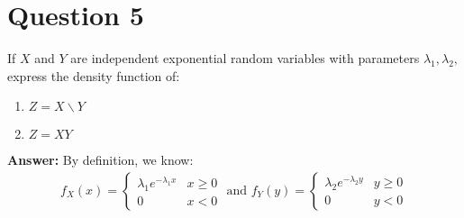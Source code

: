 \documentclass[hidelinks]{article}
\begin{document}
\section{Question 5}
If $X$ and $Y$ are independent exponential random variables with parameters $\lambda_1, \lambda_2,$ express the density function of:
\begin{enumerate}
    \item $Z = X\backslash Y$
    \item $Z = XY$
\end{enumerate}
\textbf{Answer:}
By definition, we know:
\begin{align*}
    f_X(x) = 
    \begin{cases}
        \lambda_1 e^{-\lambda_1 x} & x \geq 0 \\
        0 & x < 0
    \end{cases}
    \text{  and  }
    f_Y(y) = 
    \begin{cases}
        \lambda_2 e^{-\lambda_2 y} & y \geq 0 \\
        0 & y < 0
    \end{cases}
\end{align*}
\end{document}
